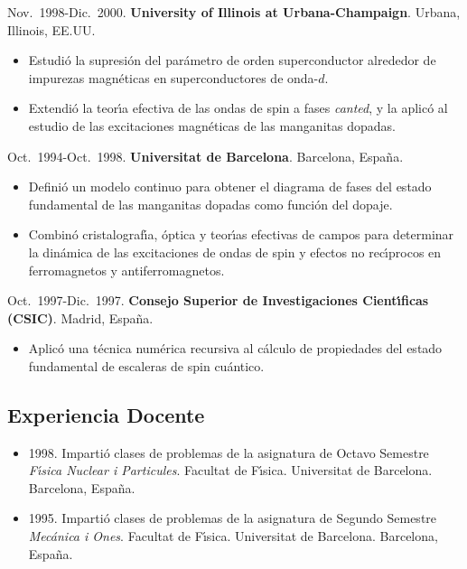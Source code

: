 \documentclass{article}
\begin{document}
Nov.~1998-Dic.~2000. {\bf University of Illinois at Urbana-Champaign}. 
Urbana, Illinois, EE.UU.

\begin{itemize}\itemsep 0pt
\item Estudi\'{o} la supresi\'{o}n del par\'{a}metro de orden superconductor 
alrededor de impurezas magn\'{e}ticas en superconductores de onda-$d$.

\item Extendi\'{o} la teor\'{\i}a efectiva de las ondas de spin 
a fases {\em canted}, y la aplic\'{o} al estudio de las excitaciones 
magn\'{e}ticas de las manganitas dopadas.
\end{itemize}

Oct.~1994-Oct.~1998. {\bf Universitat de Barcelona}. Barcelona, Espa\~na.

\begin{itemize}\itemsep 0pt
\item Defini\'{o} un modelo continuo para obtener el diagrama de fases del 
estado fundamental de las manganitas dopadas como funci\'{o}n del dopaje.

\item Combin\'{o} cristalograf\'{\i}a, \'{o}ptica y teor\'{\i}as efectivas 
de campos para determinar la din\'{a}mica de las excitaciones de ondas de 
spin y efectos no rec\'{\i}procos en ferromagnetos y antiferromagnetos.
\end{itemize}

Oct.~1997-Dic.~1997. 
{\bf Consejo Superior de Investigaciones Cient\'{\i}ficas (CSIC)}. Madrid, Espa\~na. 

\begin{itemize}\itemsep 0pt
\item Aplic\'{o} una t\'{e}cnica num\'{e}rica recursiva al c\'{a}lculo 
de propiedades del estado fundamental de escaleras de spin cu\'{a}ntico.
\end{itemize}



\subsection*{Experiencia Docente}

\begin{itemize}\itemsep 0pt
\item 1998.
Imparti\'{o} clases de problemas de la asignatura de Octavo Semestre 
{\it F\'{\i}sica Nuclear i Parti\-cu\-les}. 
Facultat de F\'{\i}sica. 
Universitat de Barcelona. 
Barcelona, Espa\~na.

\item 1995.
Imparti\'{o} clases de problemas de la asignatura de Segundo Semestre 
{\it Mec\'{a}nica i Ones}. 
Facultat de F\'{\i}sica. 
Universitat de Barcelona. 
Barcelona, Espa\~na.
\end{itemize}
\end{document}
